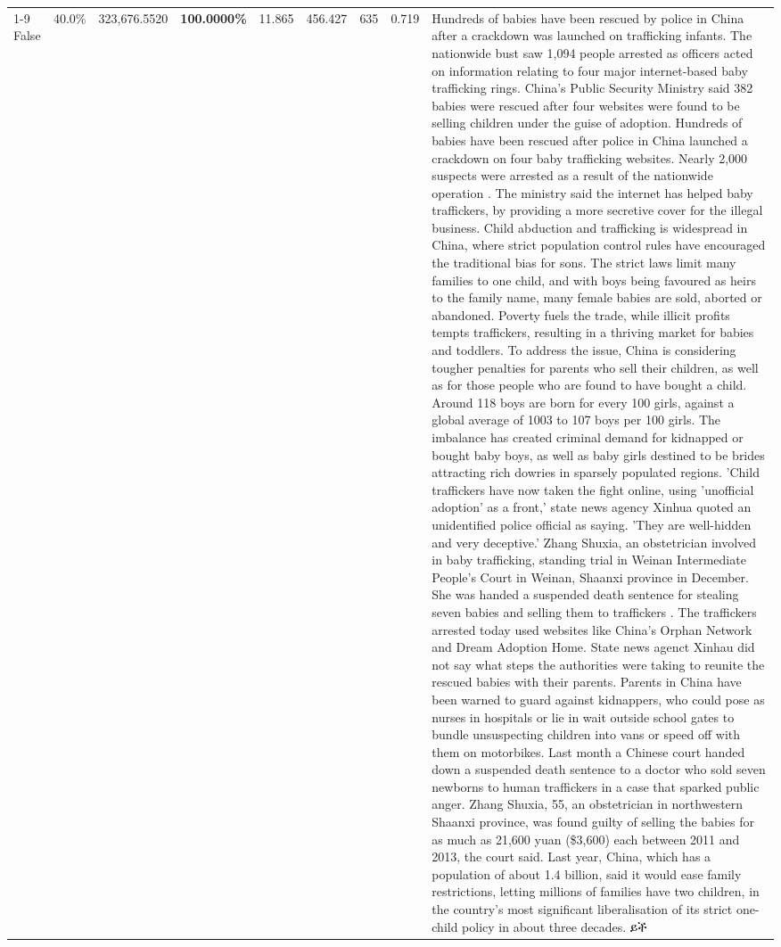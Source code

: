 \begin{table}[H]
\begin{tabular}{lllrlllll}
\cline{1-9}
False & 40.0\% & 323,676.5520 & \bfseries \color{red} 100.0000\% & 11.865 & 456.427 & 635 & 0.719 & Hundreds of babies have been rescued by police in China after a crackdown was launched on trafficking infants. The nationwide bust saw 1,094 people arrested as officers acted on information relating to four major internet-based baby trafficking rings. China's Public Security Ministry said 382 babies were rescued after four websites were found to be selling children under the guise of adoption. Hundreds of babies have been rescued after police in China launched a crackdown on four baby trafficking websites. Nearly 2,000 suspects were arrested as a result of the nationwide operation . The ministry said the internet has helped baby traffickers, by providing a more secretive cover for the illegal business. Child abduction and trafficking is widespread in China, where strict population control rules have encouraged the traditional bias for sons. The strict laws limit many families to one child, and with boys being favoured as heirs to the family name, many female babies are sold, aborted or abandoned. Poverty fuels the trade, while illicit profits tempts traffickers, resulting in a thriving market for babies and toddlers. To address the issue, China is considering tougher penalties for parents who sell their children, as well as for those people who are found to have bought a child. Around 118 boys are born for every 100 girls, against a global average of 1003 to 107 boys per 100 girls. The imbalance has created criminal demand for kidnapped or bought baby boys, as well as baby girls destined to be brides attracting rich dowries in sparsely populated regions. 'Child traffickers have now taken the fight online, using 'unofficial adoption' as a front,' state news agency Xinhua quoted an unidentified police official as saying. 'They are well-hidden and very deceptive.' Zhang Shuxia, an obstetrician involved in baby trafficking, standing trial in Weinan Intermediate People's Court in Weinan, Shaanxi province in December. She was handed a suspended death sentence for stealing seven babies and selling them to traffickers . The traffickers arrested today used websites like China's Orphan Network and Dream Adoption Home. State news agenct Xinhau did not say what steps the authorities were taking to reunite the rescued babies with their parents. Parents in China have been warned to guard against kidnappers, who could pose as nurses in hospitals or lie in wait outside school gates to bundle unsuspecting children into vans or speed off with them on motorbikes. Last month a Chinese court handed down a suspended death sentence to a doctor who sold seven newborns to human traffickers in a case that sparked public anger. Zhang Shuxia, 55, an obstetrician in northwestern Shaanxi province, was found guilty of selling the babies for as much as 21,600 yuan (\$3,600) each between 2011 and 2013, the court said. Last year, China, which has a population of about 1.4 billion, said it would ease family restrictions, letting millions of families have two children, in the country's most significant liberalisation of its strict one-child policy in about three decades. ይች \\

\end{tabular}
\end{table}
